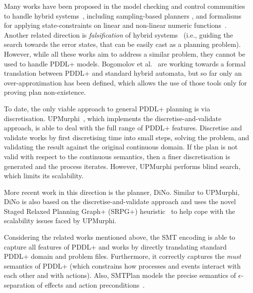 Many works have been proposed in the model checking and control communities to handle hybrid systems~\cite{hycomp,nuxmv,smthybrid,pappas,maly}, including sampling-based planners \cite{rrt,sampl}, and formalisms for applying state-constraints on linear and non-linear numeric functions~\cite{haslum2018extending}. Another related direction is  \textit{falsification} of hybrid systems~\cite{falsif} (i.e., guiding the search towards the error states, that can be easily cast as a planning problem). However, while all these works aim to address a similar problem, they cannot be used to handle PDDL+ models. Bogomolov et al.~\cite{bogomolov14,bogomolov15} are working towards a formal translation between PDDL+ and standard hybrid automata, but so far only an over-approximation has been defined, which allows the use of those tools only for proving plan non-existence.

To date, the only viable approach to general PDDL+ planning is via discretisation. UPMurphi~\cite{upmurphi}, which implements the discretise-and-validate approach, is able to deal with the full range of PDDL+ features. Discretise and validate works by first discretising time into small steps, solving the problem, and validating the result against the original continuous domain. If the plan is not valid with respect to the continuous semantics, then a finer discretisation is generated and the process iterates. However, UPMurphi performs blind search, which limits its scalability.

More recent work in this direction is the planner, DiNo. Similar to UPMurphi, DiNo is also based on the discretise-and-validate approach and uses the novel Staged Relaxed Planning Graph+ (SRPG+) heuristic~\cite{piotrowski2016heuristic} to help cope with the scalability issues faced by UPMurphi.

Considering the related works mentioned above, the SMT encoding is able to capture all features of PDDL+ and works by directly translating standard PDDL+ domain and problem files. Furthermore, it correctly captures the \textit{must} semantics of PDDL+ (which constrains how processes and events interact with each other and with actions). Also, SMTPlan models the precise semantics of $\epsilon$-separation of effects and action preconditions~\cite{pddl+}.

